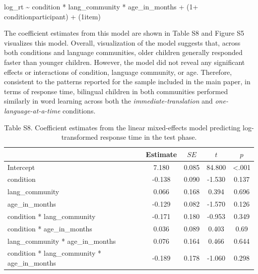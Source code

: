 \documentclass[
  man,floatsintext]{apa7}
\begin{document}
log\_rt \textasciitilde{} condition * lang\_community * age\_in\_months + (1+ condition\textbar participant) + (1\textbar item)

\noindent The coefficient estimates from this model are shown in Table S8 and Figure S5 visualizes this model. Overall, visualization of the model suggests that, across both conditions and language communities, older children generally responded faster than younger children. However, the model did not reveal any significant effects or interactions of condition, language community, or age. Therefore, consistent to the patterns reported for the sample included in the main paper, in terms of response time, bilingual children in both communities performed similarly in word learning across both the \emph{immediate-translation} and \emph{one-language-at-a-time} conditions.

\begin{table}[H]

\begin{center}
\begin{threeparttable}

\caption{\label{tab:unnamed-chunk-24}Table S8. Coefficient estimates from the linear mixed-effects model predicting log-transformed response time in the test phase.}

\begin{tabular}{lcccc}
\toprule
 & Estimate & $SE$ & $t$ & $p$\\
\midrule
Intercept & 7.180 & 0.085 & 84.800 & <.001\\
condition & -0.138 & 0.090 & -1.530 & 0.137\\
lang\_community & 0.066 & 0.168 & 0.394 & 0.696\\
age\_in\_months & -0.129 & 0.082 & -1.570 & 0.126\\
condition * lang\_community & -0.171 & 0.180 & -0.953 & 0.349\\
condition * age\_in\_months & 0.036 & 0.089 & 0.403 & 0.69\\
lang\_community * age\_in\_months & 0.076 & 0.164 & 0.466 & 0.644\\
condition * lang\_community * age\_in\_months & -0.189 & 0.178 & -1.060 & 0.298\\
\bottomrule
\end{tabular}

\end{threeparttable}
\end{center}

\end{table}
\end{document}
